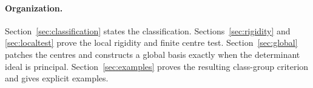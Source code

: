 

\paragraph{Organization.}
Section~\ref{sec:classification} states the classification.
Sections~\ref{sec:rigidity} and \ref{sec:localtest} prove the local
rigidity and finite centre test. Section~\ref{sec:global} patches the
centres and constructs a global basis exactly when the determinant
ideal is principal. Section~\ref{sec:examples} proves the resulting
class-group criterion and gives explicit examples.
